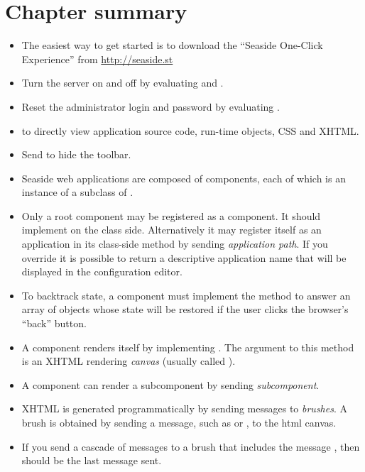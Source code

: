 \documentclass[a4paper,10pt,twoside]{book}
\begin{document}
\section{Chapter summary}

\begin{itemize}
  \item The easiest way to get started is to download the ``Seaside One-Click Experience'' from \url{http://seaside.st}
  \item Turn the server on and off by evaluating  and .
  \item Reset the administrator login and password by evaluating .
  \item {} to directly view application source code, run-time objects, CSS and XHTML.
  \item Send  to hide the toolbar.
  \item Seaside web applications are composed of components, each of which is an instance of a subclass of .
  \item Only a root component may be registered as a component. It should implement  on the class side. Alternatively it may register itself as an application in its class-side  method by sending  \emph{application path}.
  If you override  it is possible to return a descriptive application name that will be displayed in the configuration editor.
  \item To backtrack state, a component must implement the  method to answer an array of objects whose state will be restored if the user clicks the browser's ``back'' button.
  \item A component renders itself by implementing .
  The argument to this method is an XHTML rendering \emph{canvas} (usually called ).
  \item A component can render a subcomponent by sending  \emph{subcomponent}.
  \item XHTML is generated programmatically by sending messages to \emph{brushes}. A brush is obtained by sending a message, such as  or , to the html canvas.
  \item If you send a cascade of messages to a brush that includes the message , then  should be the last message sent.

\end{itemize}
\end{document}
